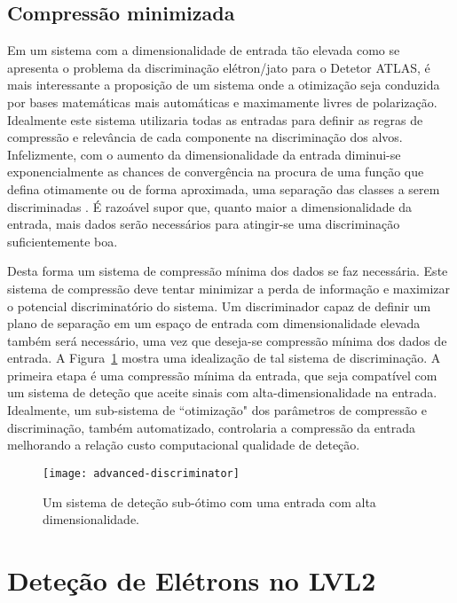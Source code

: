 \subsection{Compressão minimizada}

Em um sistema com a dimensionalidade de entrada tão elevada como se apresenta
o problema da discriminação elétron/jato para o Detetor ATLAS, é mais
interessante a proposição de um sistema onde a otimização seja conduzida por
bases matemáticas mais automáticas e maximamente livres de
polarização. Idealmente este sistema utilizaria todas as entradas para definir
as regras de compressão e relevância de cada componente na discriminação dos
alvos. Infelizmente, com o aumento da dimensionalidade da entrada diminui-se
exponencialmente as chances de convergência na procura de uma função que
defina otimamente ou de forma aproximada, uma separação das classes a serem
discriminadas \cite{haykin}. É razoável supor que, quanto maior a
dimensionalidade da entrada, mais dados serão necessários para atingir-se uma
discriminação suficientemente boa. 

Desta forma um sistema de compressão mínima dos dados se faz necessária. Este
sistema de compressão deve tentar minimizar a perda de informação e maximizar
o potencial discriminatório do sistema. Um discriminador capaz de definir um
plano de separação em um espaço de entrada com dimensionalidade elevada também
será necessário, uma vez que deseja-se compressão mínima dos dados de
entrada. A Figura~\ref{fig:advanced-discriminator} mostra uma idealização de
tal sistema de discriminação. A primeira etapa é uma compressão mínima da
entrada, que seja compatível com um sistema de deteção que aceite sinais com
alta-dimensionalidade na entrada. Idealmente, um sub-sistema de ``otimização"
dos parâmetros de compressão e discriminação, também automatizado, controlaria
a compressão da entrada melhorando a relação custo computacional 
qualidade de deteção.

\begin{figure}
\begin{center}
\texttt{[image: advanced-discriminator]}
\end{center}
\caption{Um sistema  de deteção sub-ótimo com uma entrada com alta
dimensionalidade.}
\label{fig:advanced-discriminator}
\end{figure}

\section{Deteção de Elétrons no LVL2}
\label{sec:lvl2-detect-electron}

